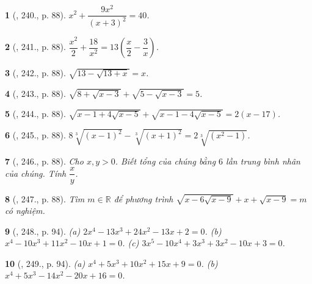 \documentclass{article}
\newtheorem{baitoan}{}
\begin{document}
\begin{baitoan}[\cite{Tuyen_Toan_9_old}, 240., p. 88]
	$x^2 + \dfrac{9x^2}{(x + 3)^2} = 40$.
\end{baitoan}

\begin{baitoan}[\cite{Tuyen_Toan_9_old}, 241., p. 88]
	$\dfrac{x^2}{2} + \dfrac{18}{x^2} = 13\left(\dfrac{x}{2} - \dfrac{3}{x}\right)$.
\end{baitoan}

\begin{baitoan}[\cite{Tuyen_Toan_9_old}, 242., p. 88]
	$\sqrt{13 - \sqrt{13 + x}} = x$.
\end{baitoan}

\begin{baitoan}[\cite{Tuyen_Toan_9_old}, 243., p. 88]
	$\sqrt{8 + \sqrt{x - 3}} + \sqrt{5 - \sqrt{x - 3}} = 5$.
\end{baitoan}

\begin{baitoan}[\cite{Tuyen_Toan_9_old}, 244., p. 88]
	$\sqrt{x - 1 + 4\sqrt{x - 5}} + \sqrt{x - 1 - 4\sqrt{x - 5}} = 2(x - 17)$.
\end{baitoan}

\begin{baitoan}[\cite{Tuyen_Toan_9_old}, 245., p. 88]
	$8\sqrt[3]{(x - 1)^2} - \sqrt[3]{(x + 1)^2} = 2\sqrt[3]{(x^2 - 1)}$.
\end{baitoan}

\begin{baitoan}[\cite{Tuyen_Toan_9_old}, 246., p. 88]
	Cho $x,y > 0$. Biết tổng của chúng bằng $6$ lần trung bình nhân của chúng. Tính $\dfrac{x}{y}$.
\end{baitoan}

\begin{baitoan}[\cite{Tuyen_Toan_9_old}, 247., p. 88]
	Tìm $m\in\mathbb{R}$ để phương trình $\sqrt{x - 6\sqrt{x - 9}} + x + \sqrt{x - 9} = m$ có nghiệm.
\end{baitoan}

\begin{baitoan}[\cite{Tuyen_Toan_9_old}, 248., p. 94]
	(a) $2x^4 - 13x^3 + 24x^2 - 13x + 2 = 0$. (b) $x^4 - 10x^3 + 11x^2 - 10x + 1 = 0$. (c) $3x^5 - 10x^4 + 3x^3 + 3x^2 - 10x + 3 = 0$.
\end{baitoan}

\begin{baitoan}[\cite{Tuyen_Toan_9_old}, 249., p. 94]
	(a) $x^4 + 5x^3 + 10x^2 + 15x + 9 = 0$. (b) $x^4 + 5x^3 - 14x^2 - 20x + 16 = 0$.
\end{baitoan}
\end{document}
